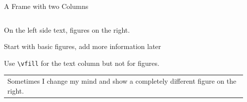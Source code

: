 
\begin{frame}{A Frame with two Columns}
  \begin{columns}
    \begin{column}{.45\textwidth}
      \minipage[c][0.65\textheight][s]{\columnwidth}
      \vspace{0.05\textheight}
      
      On the left side text, figures on the right.

      \vfill


      Start with basic figures, add more information later

      \vfill


      Use \texttt{\textbackslash vfill} for the text column but not
      for figures.

      \vfill
      \begin{tabular}{|p{}}
        Sometimes I change my mind and show a completely different
        figure on the right.
      \end{tabular}
   
      
      \endminipage      
    \end{column}
    \begin{column}{.55\textwidth}
      \minipage[c][0.8\textheight][s]{\columnwidth}
      
      

      


      
      \endminipage
    \end{column}
  \end{columns}

\end{frame}
